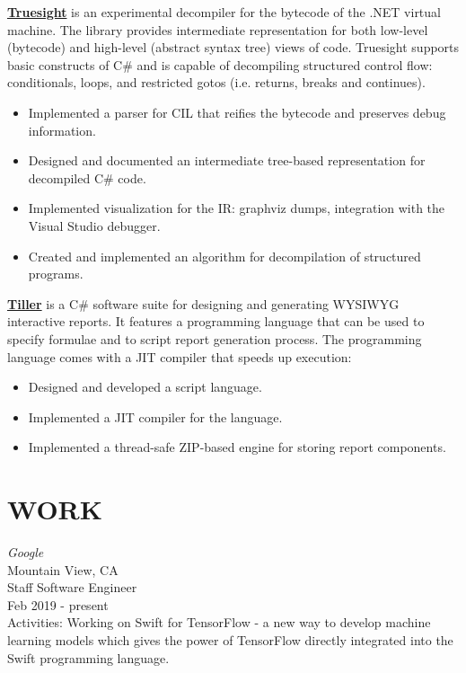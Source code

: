 \documentclass[margin, 10pt]{Stylesheet}
\begin{document}
\begin{resume}
\textbf{\href{http://code.google.com/p/truesight-lite/}{Truesight}} is an experimental decompiler
for the bytecode of the .NET virtual machine. The library provides intermediate representation for
both low-level (bytecode) and high-level (abstract syntax tree) views of code. Truesight supports
basic constructs of C\# and is capable of decompiling structured control flow: conditionals, loops,
and restricted gotos (i.e. returns, breaks and continues).

\begin{itemize} \itemsep -2pt
\item Implemented a parser for CIL that reifies the bytecode and preserves debug information.
\item Designed and documented an intermediate tree-based representation for decompiled C\# code.
\item Implemented visualization for the IR: graphviz dumps, integration with the Visual Studio debugger.
\item Created and implemented an algorithm for decompilation of structured programs.
\end{itemize}

\textbf{\href{http://code.google.com/p/elf4b/}{Tiller}} is a C\# software suite for designing and
generating WYSIWYG interactive reports. It features a programming language that can be used to
specify formulae and to script report generation process. The programming language comes with
a JIT compiler that speeds up execution:

\begin{itemize} \itemsep -2pt
\item Designed and developed a script language.
\item Implemented a JIT compiler for the language.
\item Implemented a thread-safe ZIP-based engine for storing report components.
\end{itemize}

\section{WORK}

\emph{Google}\\
Mountain View, CA \\
Staff Software Engineer \\
Feb 2019 - present\\
Activities: Working on Swift for TensorFlow - a new way to develop machine learning models which
gives the power of TensorFlow directly integrated into the Swift programming language.


\end{resume}
\end{document}
